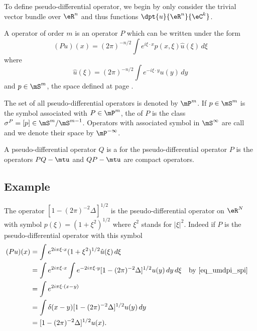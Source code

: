 To define pseudo-differential operator, we begin by only consider the trivial vector bundle over $\eR^n$ and thus functions $\dpt{ u }{ \eR^n }{ \eC^k }$.

\begin{definition}	
	A  operator of order $m$ is an operator $P$ which can be written under the form
	\begin{equation}
		(Pu)(x)=(2\pi)^{-n/2}\int e^{i\xi\cdot x}p(x,\xi)\hat u(\xi)\,d\xi
	\end{equation}
	where
	\begin{equation}
		\hat u(\xi)=(2\pi)^{-n/2}\int e^{-i\xi\cdot y}u(y)\,dy
	\end{equation}
	and $p\in\mS^m$, the space defined at page \pageref{pg:defmS}.  
\end{definition}

The set of all pseudo-differential operators is denoted by $\mP^m$. If $p\in\mS^m$ is the symbol associated with $P\in\mP^m$, the  of $P$ is the class $\sigma^P=[p]\in\mS^m/\mS^{m-1}$. Operators with associated symbol in $\mS^{\-\infty}$ are call  and we denote their space by $\mP^{-\infty}$.

A pseudo-differential operator $Q$ is a  for the pseudo-differential operator $P$ is the operators $PQ-\mtu$ and $QP-\mtu$ are compact operators.


\subsection{Example} \label{pg_exem_psdo}

The operator $[1-(2\pi)^{-2}\Delta]^{1/2}$ is the pseudo-differential operator on $\eR^N$ with symbol $p(\xi)=(1+\xi^2)^{1/2}$ where $\xi^2$ stands for $| \xi |^2$. Indeed if $P$ is the pseudo-differential operator with this symbol
\[
\begin{aligned}
  (Pu)(x)&=\int e^{2i\pi\xi\cdot x} (1+\xi^2)^{1/2}\hat u(\xi)\,d\xi\\
   	&=\int e^{2i\pi\xi\cdot x}\int e^{-2i\pi\xi\cdot y}[1-(2\pi)^{-2}\Delta]^{1/2}u(y)\,dy\,d\xi	&& \text{by \eqref{eq_umdpi_spi}}\\
	&=\int e^{2i\pi\xi\cdot(x-y)}\\
	&=\int\delta(x-y)[1-(2\pi)^{-2}\Delta]^{1/2}u(y)\,dy\\
	&=[1-(2\pi)^{-2}\Delta]^{1/2}u(x).
\end{aligned}
\]

